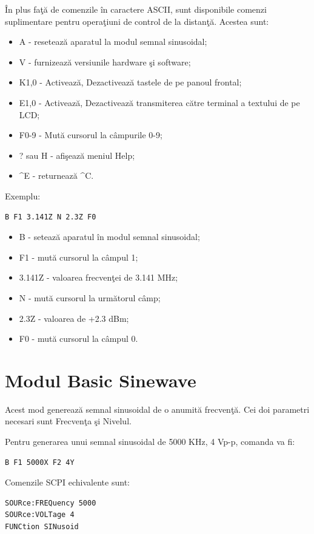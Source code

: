 \^{I}n plus fa\c{t}\u{a} de comenzile \^{i}n caractere ASCII, sunt disponibile comenzi suplimentare pentru opera\c{t}iuni de control de la distan\c{t}\u{a}. Acestea sunt:
\begin{itemize}
	\item A - reseteaz\u{a} aparatul la modul semnal sinusoidal;
	\item V - furnizeaz\u{a} versiunile hardware \c{s}i software;
	\item K1,0 - Activeaz\u{a}, Dezactiveaz\u{a} tastele de pe panoul frontal;
	\item E1,0 - Activeaz\u{a}, Dezactiveaz\u{a} transmiterea c\u{a}tre terminal a textului de pe LCD;
	\item F0-9 - Mut\u{a} cursorul la c\^{a}mpurile 0-9;
	\item ? sau H - afi\c{s}eaz\u{a} meniul Help;
	\item \textasciicircum E - returneaz\u{a} \textasciicircum C.
\end{itemize}

Exemplu:
\begin{verbatim}
B F1 3.141Z N 2.3Z F0
\end{verbatim}
\begin{itemize}
	\item B - seteaz\u{a} aparatul \^{i}n modul semnal sinusoidal;
	\item F1 - mut\u{a} cursorul la c\^{a}mpul 1;
	\item 3.141Z - valoarea frecven\c{t}ei de 3.141 MHz;
	\item N - mut\u{a} cursorul la urm\u{a}torul c\^{a}mp;
	\item 2.3Z - valoarea de +2.3 dBm;
	\item F0 - mut\u{a} cursorul la c\^{a}mpul 0.
\end{itemize}

\section{Modul Basic Sinewave}
Acest mod genereaz\u{a} semnal sinusoidal de o anumit\u{a} frecven\c{t}\u{a}. Cei doi parametri necesari sunt Frecven\c{t}a \c{s}i Nivelul.

Pentru generarea unui semnal sinusoidal de 5000 KHz, 4 Vp-p, comanda va fi:

\begin{verbatim}B F1 5000X F2 4Y \end{verbatim}

Comenzile SCPI echivalente sunt:
\begin{verbatim}
SOURce:FREQuency 5000
SOURce:VOLTage 4
FUNCtion SINusoid
\end{verbatim}

